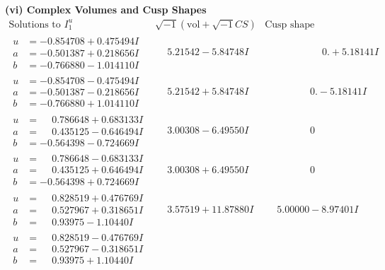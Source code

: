 \documentclass[1p]{elsarticle_modified}
\theoremstyle{definition}
\newcommand{\I}{\sqrt{-1}}
\begin{document}
\newpage\flushleft \textbf{(vi) Complex Volumes and Cusp Shapes}
$$\begin{array}{c|c|c}  
\text{Solutions to }I^u_{1}& \I (\text{vol} + \sqrt{-1}CS) & \text{Cusp shape}\\
 \hline 
\begin{aligned}
u &= -0.854708 + 0.475494 I \\
a &= -0.501387 + 0.218656 I \\
b &= -0.766880 - 1.014110 I\end{aligned}
 & \phantom{-}5.21542 - 5.84748 I & \phantom{-0.000000 -}0. + 5.18141 I \\ \hline\begin{aligned}
u &= -0.854708 - 0.475494 I \\
a &= -0.501387 - 0.218656 I \\
b &= -0.766880 + 1.014110 I\end{aligned}
 & \phantom{-}5.21542 + 5.84748 I & \phantom{-0.000000 } 0. - 5.18141 I \\ \hline\begin{aligned}
u &= \phantom{-}0.786648 + 0.683133 I \\
a &= \phantom{-}0.435125 - 0.646494 I \\
b &= -0.564398 - 0.724669 I\end{aligned}
 & \phantom{-}3.00308 - 6.49550 I & \phantom{-0.000000 } 0 \\ \hline\begin{aligned}
u &= \phantom{-}0.786648 - 0.683133 I \\
a &= \phantom{-}0.435125 + 0.646494 I \\
b &= -0.564398 + 0.724669 I\end{aligned}
 & \phantom{-}3.00308 + 6.49550 I & \phantom{-0.000000 } 0 \\ \hline\begin{aligned}
u &= \phantom{-}0.828519 + 0.476769 I \\
a &= \phantom{-}0.527967 + 0.318651 I \\
b &= \phantom{-}0.93975 - 1.10440 I\end{aligned}
 & \phantom{-}3.57519 + 11.87880 I & \phantom{-}5.00000 - 8.97401 I \\ \hline\begin{aligned}
u &= \phantom{-}0.828519 - 0.476769 I \\
a &= \phantom{-}0.527967 - 0.318651 I \\
b &= \phantom{-}0.93975 + 1.10440 I\end{aligned}

\end{array}$$
\end{document}
